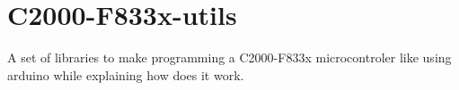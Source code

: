 \chapter{C2000-\/\+F833x-\/utils}
\hypertarget{md__r_e_a_d_m_e}{}\label{md__r_e_a_d_m_e}
\label{md__r_e_a_d_m_e_autotoc_md0}%
%
A set of libraries to make programming a C2000-\/\+F833x microcontroler like using arduino while explaining how does it work. 